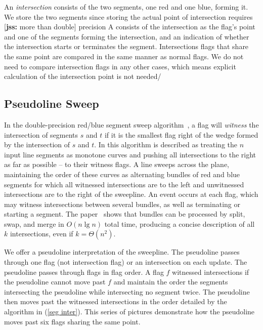 \documentclass[11pt]{article}
\def\sm#1{{\footnotesize [{\bf jss:} #1]}}
\begin{document}
An \textit{intersection} consists of the two segments, one red and one blue, forming it.
We store the two segments since storing the actual point of intersection requires \sm{more than double} precision
A  consists of the intersection as the flag's point and one of the segments forming the intersection, and an indication of whether the intersection starts or terminates the segment.
Intersections flags that share the same point are compared in the same manner as normal flags.
We do not need to compare intersection flags in any other cases, which means explicit calculation of the intersection point is not needed/


\subsection{Pseudoline Sweep}\label{sec psweep}
In the double-precision red/blue segment sweep algorithm~\cite{MS}, a flag will \textit{witness} the intersection of segments $s$ and $t$ if it is the smallest flag right of the wedge formed by the intersection of $s$ and $t$.
In \cite{MS} this algorithm is described as treating the $n$ input line segments as monotone curves and pushing all intersections to the right as far as possible -- to their witness flags.
A line sweeps across the plane, maintaining the order of these curves as alternating bundles of red and blue segments for which all witnessed intersections are to the left and unwitnessed intersections are to the right of the sweepline. 
An event occurs at each flag, which may witness intersections between several bundles, as well as terminating or starting a segment.  
The paper~\cite{MS} shows that bundles can be processed by split, swap, and merge in $O(n\lg n)$ total time, producing a concise description of all $k$ intersections, even if $k=\Theta(n^2)$.

We offer a pseudoline interpretation of the sweepline.
The pseudoline passes through one flag (not intersection flag) or an intersection on each update.
The pseudoline passes through flags in flag order.
A flag $f$ witnessed intersections if the pseudoline cannot move past $f$ and maintain the order the segments intersecting the pseudoline while intersecting no segment twice.
The pseudoline then moves past the witnessed intersections in the order detailed by the algorithm in (\ref{seg inter}).
This series of pictures demonstrate how the pseudoline moves past six flags sharing the same point.
\end{document}

